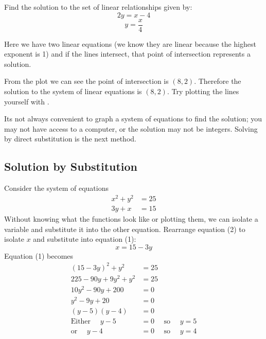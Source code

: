  \example Find the solution to the set of linear relationships given by:
 $$2y=x-4$$
 $$y=\frac{x}{4}$$
  \begin{multicols}{2}
 \solution Here we have two linear equations (we know they are linear because the highest exponent is 1) and if the lines intersect, that point of intersection represents a solution. 
 	
 	From the plot we can see the point of intersection is $(8,2)$. Therefore the solution to the system of linear equations is $(8,2)$. Try plotting the lines yourself with \desmos.
 	
 	
 	Its not always convenient to graph a system of equations to find the solution; you may not have access to a computer, or the solution may not be integers. Solving by direct substitution is the next method.
 	\columnbreak
 \begin{center}
\end{center}
\end{multicols}
 \subsection*{Solution by Substitution}
 \example Consider the system of equations
 \begin{align}x^{2} +y^{2} &  = 25 \tag{1} \\
 3 y +x &  = 15 \tag{2}\end{align}
 \solution Without knowing what the functions look like or plotting them, we can isolate a variable and substitute it into the other equation. Rearrange equation (2) to isolate $x$ and substitute into equation (1):
$$x =  15 -3 y $$
 Equation (1) becomes
 \begin{align*}(15-3y)^2+y^2 &  =  25 \tag{expand and simplify}\\
 225-90y+9y^2+y^2&=25\\
 10 y^{2} -90 y +200 &  =  0 \tag{divide by 10}\\
 y^{2} -9 y +20 &  = 0 \tag{factor the quadratic}\\
 \left (y -5\right ) \left (y -4\right ) &  =  0 \\
 \text{Either }\quad y -5 &  =  0\quad\text{ so }\quad y =5 \\
 \text{or }\quad y -4 &  =  0\quad\text{ so }\quad y =4\end{align*}
 
